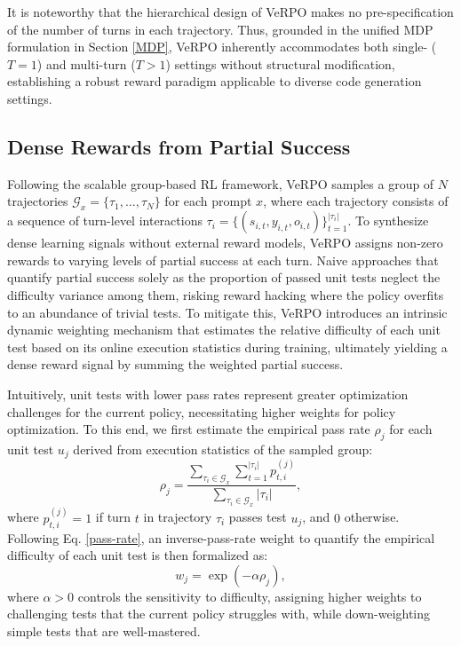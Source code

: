 \documentclass[11pt]{article}
\begin{document}
It is noteworthy that the hierarchical design of VeRPO makes no pre-specification of the number of turns in each trajectory. Thus, grounded in the unified MDP formulation in Section \ref{MDP}, VeRPO inherently accommodates both single- ($T=1$) and multi-turn ($T>1$) settings without structural modification, establishing a robust reward paradigm applicable to diverse code generation settings.

\subsection{Dense Rewards from Partial Success}\label{method:partial success}
Following the scalable group-based RL framework, VeRPO samples a group of $N$ trajectories $\mathcal{G}_x = \{\tau_1, \ldots, \tau_{N}\}$ for each prompt $x$, where each trajectory consists of a sequence of turn-level interactions $\tau_i = \{(s_{i,t}, y_{i,t}, o_{i,t})\}_{t=1}^{|\tau_i|}$. To synthesize dense learning signals without external reward models, VeRPO assigns non-zero rewards to varying levels of partial success at each turn. Naive approaches that quantify partial success solely as the proportion of passed unit tests neglect the difficulty variance among them, risking reward hacking where the policy overfits to an abundance of trivial tests. To mitigate this, VeRPO introduces an intrinsic dynamic weighting mechanism that estimates the relative difficulty of each unit test based on its online execution statistics during training, ultimately yielding a dense reward signal by summing the weighted partial success.  

Intuitively, unit tests with lower pass rates represent greater optimization challenges for the current policy, necessitating higher weights for policy optimization. To this end, we first estimate the empirical pass rate $\rho_j$ for each unit test $u_j$ derived from execution statistics of the sampled group:
\begin{equation}
\rho_j = \frac{\sum_{\tau_i \in \mathcal{G}_x} \sum_{t=1}^{|\tau_{i}|} p_{t,i}^{(j)}}{\sum_{\tau_i \in \mathcal{G}_x} |\tau_{i}|},
\label{pass-rate}
\end{equation}
where $p_{t,i}^{(j)} = 1$ if turn $t$ in trajectory $\tau_i$ passes test $u_j$, and $0$ otherwise. Following Eq. \ref{pass-rate}, an inverse-pass-rate weight to quantify the empirical difficulty of each unit test is then formalized as: 
\begin{equation}
w_j = \exp(-\alpha \rho_j),
\label{eq:w_J}
\end{equation}
where $\alpha > 0$ controls the sensitivity to difficulty, assigning higher weights to challenging tests that the current policy struggles with, while down-weighting simple tests that are well-mastered.
\end{document}

